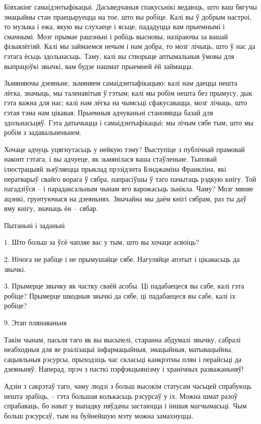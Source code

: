 Біяхакінг самаідэнтыфікацыі. Дасьведчаныя спакусьнікі ведаюць, што ваш бягучы эмацыйны стан праецыруецца на тое, што вы робіце. Калі вы ў добрым настроі, то музыка і ежа, якую вы слухаеце і ясьце, пададуцца вам прыемнымі і смачнымі. Мозг прымае рашэньні і робіць высновы, назіраючы за вашай фізыялёгіяй. Калі мы займаемся нечым і нам добра, то мозг лічыць, што ў нас да гэтага ёсьць здольнасьць. Таму, калі вы створыце аптымальныя ўмовы для выпрацоўкі звычкі, вам будзе нашмат прыемней ёй займацца.

Зьмяняючы дзеяньне, зьмяняем самаідэнтыфікацыю: калі нам даецца нешта лёгка, значыць, мы таленавітыя ў гэтым; калі мы робім нешта без прымусу, дык гэта важна для нас; калі нам лёгка на чымсьці сфакусавацца, мозг лічыць, што гэтая тэма нам цікавая. Прыемныя адчуваньні становяцца базай для здольнасьцяў. Гэта датычыцца і самаідэнтыфікацыі: мы лічым сябе тым, што мы робім з задавальненьнем.

Хочаце адчуць уцягнутасьць у нейкую тэму? Выступіце з публічнай прамовай наконт гэтага, і вы адчуеце, як зьмянілася ваша стаўленьне. Тыповай ілюстрацыяй зьяўляецца прыклад прэзідэнта Бэнджаміна Франкліна, які ператварыў свайго ворага ў сябра, папрасіўшы ў таго пачытаць рэдкую кнігу. Той пагадзіўся – і парадаксальным чынам яго варожасьць зьнікла. Чаму? Мозг мяняе ацэнкі, грунтуючыся на дзеяньнях. Звычайна мы даём кнігі сябрам, раз ты даў яму кнігу, значыць ён – сябар.

Пытаньні і заданьні

1. Што больш за ўсё чапляе вас у тым, што вы хочаце асвоіць?

2. Нічога не рабіце і не прымушайце сябе. Нагуляйце апэтыт і цікавасьць да звычкі.

3. Прымерце звычку як частку сваёй асобы. Ці падабаецеся вы сабе, калі гэта робіце? Прымерце шкодныя звычкі да сябе, ці падабаецеся вы сабе, калі іх робіце?


9. Этап плянаваньня

Такім чынам, пасьля таго як вы высьпелі, старанна абдумалі звычку, сабралі неабходныя для яе рэалізацыі інфармацыйныя, эмацыйныя, матывацыйны, сацыяльныя рэсурсы, прыходзіць час скласьці канкрэтны плян і перайсьці да дзеяньняў. Наперад, прэч з пасткі пэрфэкцыянізму і хранічных разважаньняў!

Адзін з сакрэтаў таго, чаму людзі з больш высокім статусам часьцей спрабуюць нешта зрабіць, – гэта большая колькасьць рэсурсаў у іх. Можна шмат разоў спрабаваць, бо нават у выпадку няўдачы застаюцца і іншыя магчымасьці. Чым больш рэсурсаў, тым на буйнейшую мэту можна замахнуцца.


